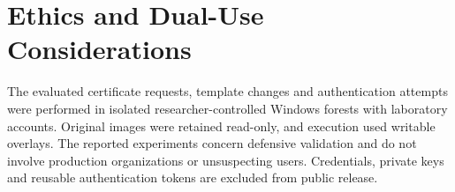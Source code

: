 \section*{Ethics and Dual-Use Considerations}
\noindent The evaluated certificate requests, template changes and authentication attempts were performed in isolated researcher-controlled Windows forests with laboratory accounts. Original images were retained read-only, and execution used writable overlays. The reported experiments concern defensive validation and do not involve production organizations or unsuspecting users. Credentials, private keys and reusable authentication tokens are excluded from public release.
